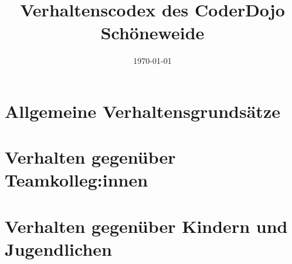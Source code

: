 \documentclass[11pt]{article}
\title{\huge\textbf{Verhaltenscodex des CoderDojo Schöneweide}}
\date{\today}
\author{}
\begin{document}
    \maketitle


    \section{Allgemeine Verhaltensgrundsätze}
    \label{sec:allgemeine-verhaltensgrundsaetze}
    
    \newpage


    \section{Verhalten gegenüber Teamkolleg:innen}
    \label{sec:verhalten-gegenuber-teamkolleg:innen}
    
    \newpage


    \section{Verhalten gegenüber Kindern und Jugendlichen}
    \label{sec:verhalten-gegenueber-kindern-und-jugendlichen}
    
\end{document}
